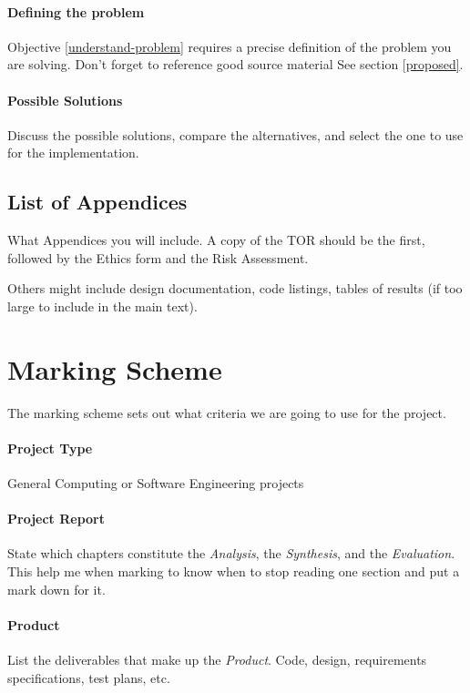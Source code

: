 \paragraph{Defining the problem}  Objective \ref{understand-problem} requires a precise definition of the problem you are solving.  Don't forget to reference good source material  See section \ref{proposed}.

\paragraph{Possible Solutions} Discuss the possible solutions, compare the
alternatives, and select the one to use for the  implementation.

\subsection{List of Appendices}
What Appendices you will include.  A copy of the TOR should be the first, followed by the Ethics form and the Risk Assessment.

Others might include design documentation, code listings, tables of results (if too large to include in the main text).

\section{Marking Scheme}
The marking scheme sets out what criteria we are going to use for the project.

\paragraph{Project Type} General Computing or Software Engineering projects

\paragraph{Project Report}  State which chapters constitute the \emph{Analysis}, the \emph{Synthesis}, and the \emph{Evaluation}.  This help me when marking to know when to stop reading one section and put a mark down for it.

\paragraph{Product}  List the deliverables that make up the \emph{Product}.  Code, design, requirements specifications, test plans, etc.

